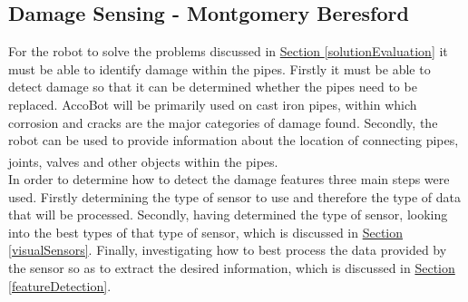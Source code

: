 \documentclass[11pt]{article}		%
\newcommand{\supercite}[1]{\textsuperscript{\cite{#1}}}		%
\newcommand{\sectref}[1]{\hyperref[#1]{Section \ref*{#1}}}     %
\begin{document}
	        
	        \subsection[Damage Sensing]{Damage Sensing - Montgomery Beresford}
	        
	        For the robot to solve the problems discussed in \sectref{solutionEvaluation} it must be able to identify damage within the pipes. 
	        Firstly it must be able to detect damage so that it can be determined whether the pipes need to be replaced.
	        AccoBot will be primarily used on cast iron pipes, within which corrosion and cracks are the major categories of damage found.  
	        Secondly, the robot can be used to provide information about the location of connecting pipes, joints, valves and other objects within the pipes.\supercite{Failure_pipes}\supercite{Failure_pipes2}
	        \\
            \hspace*{3ex}In order to determine how to detect the damage features three main steps were used. 
	        Firstly determining the type of sensor to use and therefore the type of data that will be processed. 
	        Secondly, having determined the type of sensor, looking into the best types of that type of sensor, which is discussed in \sectref{visualSensors}.
	        Finally, investigating how to best process the data provided by the sensor so as to extract the desired information, which is discussed in \sectref{featureDetection}.
	        
\end{document}
